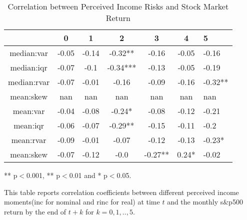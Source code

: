 
\begin{table}[ht]
\centering
\begin{threeparttable}
\caption{Correlation between Perceived Income Risks and Stock Market Return}
\label{macro_corr}\begin{tabular}{ccccccl}
\toprule
{} &      0 &      1 &         2 &        3 &      4 &        5 \\
\midrule
median:var  &  -0.05 &  -0.14 &   -0.32** &    -0.16 &  -0.05 &    -0.16 \\
median:iqr  &  -0.07 &   -0.1 &  -0.34*** &    -0.13 &  -0.05 &    -0.19 \\
median:rvar &  -0.07 &  -0.01 &     -0.16 &    -0.09 &  -0.16 &  -0.32** \\
mean:skew   &    nan &    nan &       nan &      nan &    nan &      nan \\
mean:var    &  -0.04 &  -0.08 &    -0.24* &    -0.08 &  -0.12 &    -0.21 \\
mean:iqr    &  -0.06 &  -0.07 &   -0.29** &    -0.15 &  -0.11 &     -0.2 \\
mean:rvar   &  -0.09 &  -0.01 &     -0.07 &    -0.12 &  -0.13 &   -0.23* \\
mean:skew   &  -0.07 &  -0.12 &      -0.0 &  -0.27** &  0.24* &    -0.02 \\
\bottomrule
\end{tabular}
\begin{tablenotes}
\item *** p$<$0.001, ** p$<$0.01 and * p$<$0.05. 
\item This table reports correlation coefficients between different perceived income moments(inc for nominal 
and rinc for real) at time 
$t$ and the monthly s\&p500 return by the end of $t+k$ for $k=0,1,..,5$. 
\end{tablenotes}
\end{threeparttable}
\end{table}